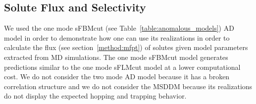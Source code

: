 \documentclass[aps,pre,preprint,groupedaddress]{revtex4-2}
\begin{document}
  
%  
  
  \subsection{Solute Flux and Selectivity}\label{section:mfpt}
  
  We used the one mode sFBMcut (see Table~\ref{table:anomalous_models}) AD
  model in order to demonstrate how one can use its realizations in order 
  to calculate the flux (see section~\ref{method:mfpt}) of solutes given 
  model parameters extracted from MD simulations. The one mode sFBMcut model
  generates predictions similar to the one mode sFLMcut model at a lower 
  computational cost. We do not consider the two mode AD model because it 
  has a broken correlation structure and we do not consider the MSDDM because
  its realizations do not display the expected hopping and trapping behavior. 
\end{document}
